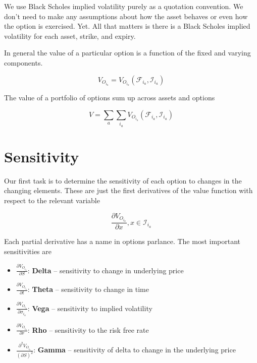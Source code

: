 We use Black Scholes implied volatility purely as a quotation convention. We don't need to make any assumptions about how the asset behaves or even how the option is exercised. Yet. All that matters is there is a Black Scholes implied volatility for each asset, strike, and expiry.

In general the value of a particular option is a function of the fixed and varying components. 

\[V_{O_{i_a}} = V_{O_{i_a}}(\mathcal{F}_{i_a},\mathcal{I}_{i_a}) \]

The value of a portfolio of options sum up across assets and options

\[V = \sum_{a}\sum_{i_a}V_{O_{i_a}}(\mathcal{F}_{i_a},\mathcal{I}_{i_a}) \]

\section{Sensitivity}

Our first task is to determine the sensitivity  of each option to changes in the changing  elements. These are just the first derivatives of the value function with respect to the relevant variable

\[ \frac{\partial V_{O_{i_a}}}{\partial x}, x \in \mathcal{I}_{i_a}  \]

Each partial derivative has a name in options parlance. The most important sensitivities are

\begin{itemize}
\item $\frac{\partial V_{O_{i_a}}}{\partial S} $:  \textbf{Delta} -- sensitivity to change in underlying price\\
\item $\frac{\partial V_{O_{i_a}}}{\partial t} $: \textbf{Theta} -- sensitivity to change in time\\
\item $\frac{\partial V_{O_{i_a}}}{\partial \sigma_{i_a}} $:  \textbf{Vega} -- sensitivity to implied volatility\\
\item  $\frac{\partial V_{O_{i_a}}}{\partial r} $: \textbf{Rho} -- sensitivity to the risk free rate\\
\item $\frac{\partial^2 V_{O_{i_a}}}{(\partial S)^2} $: \textbf{Gamma} -- sensitivity of delta to change in the underlying price\\
\end{itemize}

